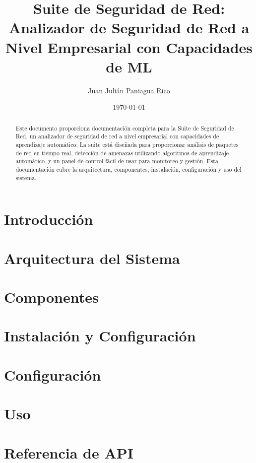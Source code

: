 \documentclass[a4paper,12pt]{article}
\title{Suite de Seguridad de Red: Analizador de Seguridad de Red a Nivel Empresarial con Capacidades de ML}
\author{Juan Julián Paniagua Rico}
\date{\today}
\begin{document}
\maketitle
\newpage
\begin{abstract}
Este documento proporciona documentación completa para la Suite de Seguridad de Red, un analizador de seguridad de red a nivel empresarial con capacidades de aprendizaje automático. La suite está diseñada para proporcionar análisis de paquetes de red en tiempo real, detección de amenazas utilizando algoritmos de aprendizaje automático, y un panel de control fácil de usar para monitoreo y gestión. Esta documentación cubre la arquitectura, componentes, instalación, configuración y uso del sistema.
\end{abstract}
\newpage
\tableofcontents
\newpage

\section{Introducción}


\section{Arquitectura del Sistema}


\section{Componentes}


\section{Instalación y Configuración}


\section{Configuración}


\section{Uso}


\section{Referencia de API}

\end{document}
